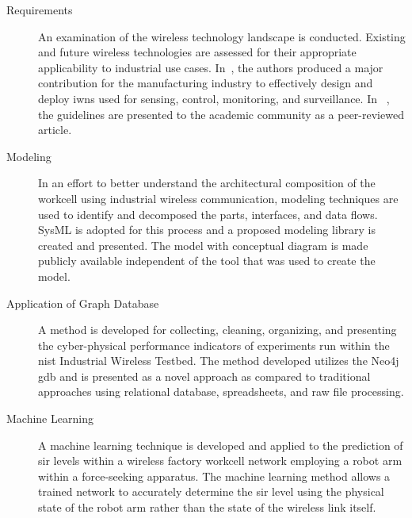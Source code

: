 		\begin{description}
	
	\item[Requirements] \cite{CandellRW2017} \cite{Montgomery2019} \cite{Candell2018.IWSGuide} \cite{ieeeMagazine2018} An examination of the wireless technology landscape is conducted.  Existing and future wireless technologies are assessed for their appropriate applicability to industrial use cases. In~\cite{Candell2018.IWSGuide}, the authors produced a major contribution for the manufacturing industry to effectively design and deploy \glspl{iwn} used for sensing, control, monitoring, and surveillance.  In ~\cite{ieeeMagazine2018}, the guidelines are presented to the academic community as a peer-reviewed article.
	
	\item[Modeling] \cite{Candell2019ASR.SYSML} \cite{Candell2018SysML.JRES} In an effort to better understand the architectural composition of the workcell using industrial wireless communication, modeling techniques are used to identify and decomposed the parts, interfaces, and data flows.  SysML is adopted for this process and a proposed modeling library is created and presented.  The model with conceptual diagram is made publicly available independent of the tool that was used to create the model.
	
	\item[Application of Graph Database] \cite{CandellISIT2020.Conf} \cite{GraphDB.JCISE.Journal} A method is developed for collecting, cleaning, organizing, and presenting the cyber-physical performance indicators of experiments run within the \gls{nist} Industrial Wireless Testbed. The method developed utilizes the Neo4j \gls{gdb} and is presented as a novel approach as compared to traditional approaches using relational database, spreadsheets, and raw file processing.
	
	\item[Machine Learning] \cite{CandellISIE2019.Conf} \cite{Candell2020.Jrnl.Access} A machine learning technique is developed and applied to the prediction of \gls{sir} levels within a wireless factory workcell network employing a robot arm within a force-seeking apparatus.  The machine learning method allows a trained network to accurately determine the \gls{sir} level using the physical state of the robot arm rather than the state of the wireless link itself.
	
\end{description}

